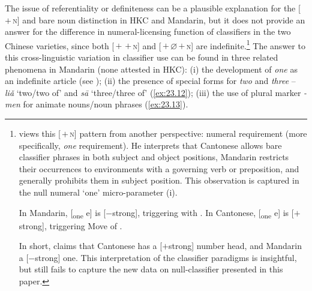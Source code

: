 \documentclass[output=paper]{langsci/langscibook}
\begin{document}
The issue of referentiality or definiteness can be a plausible explanation for
the [\Clf{}\,$+$\,\textsc{n}] and bare noun distinction in \gls{HKC} and Mandarin, but it
does not provide an answer for the difference in numeral-licensing function of
classifiers in the two Chinese varieties, since both [\Num{}\,$+$\,\Clf{}\,$+$\,\textsc{n}] and
[\Num{}\,$+$\,${\varnothing}$\,$+$\,\textsc{n}] are indefinite.\footnote{\citet{Huang2015} views
    this [\Clf{}\,$+$\,\textsc{n}] pattern from another perspective: numeral requirement
    (more specifically, \emph{one} requirement). He interprets that Cantonese
    allows bare classifier phrases in both subject and object positions,
    Mandarin restricts their occurrences to environments with a governing verb
    or preposition, and generally prohibits them in subject position. This
    observation is captured in the null numeral ‘one’ micro-parameter (i).

\begin{exe}
    \begin{xlist}
	\ex In Mandarin, [\textsubscript{one} e] is [$-$strong], triggering  with \Clf{}.
	\ex In Cantonese, [\textsubscript{one} e] is [$+$strong], triggering Move of \Clf{}.
    \end{xlist}
\end{exe}

In short, \citeauthor{Huang2015} claims that Cantonese has a [$+$strong] number
head, and Mandarin a [$-$strong] one. This interpretation of the classifier
paradigms is insightful, but still fails to capture the new data on
null-classifier  presented in this paper.} The answer to this
cross-linguistic variation in classifier use can be found in three related
phenomena in Mandarin (none attested in \gls{HKC}): (i) the development of
\emph{one} as an indefinite article (see ); (ii) the presence
of special forms for \emph{two} and \emph{three} -- \emph{liǎ} ‘two/two of’
and \emph{sā} ‘three/three of’ (\ref{ex:23.12}); (iii) the use of plural
marker \emph{-men} for animate nouns/noun phrases (\ref{ex:23.13}).\largerpage[-2]
\end{document}
